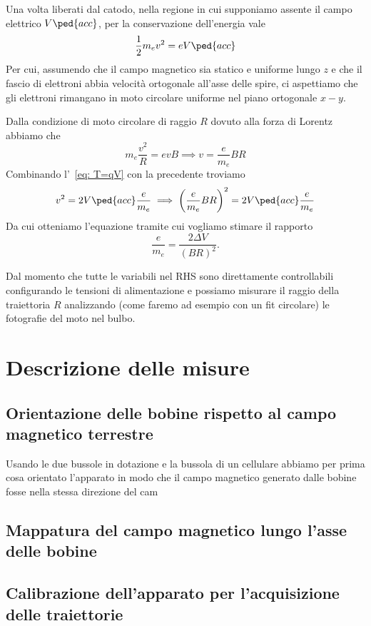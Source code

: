 \documentclass[10pt, a4paper, italian]{article}
\begin{document}
Una volta liberati dal catodo, nella regione in cui supponiamo assente il
campo elettrico $V\ped{acc}$, per la conservazione dell'energia vale
\begin{equation}\label{eq: T=qV}
    \frac{1}{2} m_{e} v^{2} = e V\ped{acc}
\end{equation}
Per cui, assumendo che il campo magnetico sia statico e uniforme lungo $z$ e
che il fascio di elettroni abbia velocità ortogonale all'asse delle spire,
ci aspettiamo che gli elettroni rimangano in moto circolare uniforme nel
piano ortogonale $x-y$.

Dalla condizione di moto circolare di raggio $R$ dovuto alla forza di Lorentz
abbiamo che
\[
m_{e} \frac{v^2}{R} = e v B \implies v = \frac{e}{m_e} B R
\]
Combinando l'~\cref{eq: T=qV} con la precedente troviamo
\[
v^2 = 2 V\ped{acc} \frac{e}{m_e} \implies \left(\frac{e}{m_e} B R\right)^2 =
2 V\ped{acc} \frac{e}{m_e}
\]
Da cui otteniamo l'equazione tramite cui vogliamo stimare il rapporto
\begin{equation}\label{eq: fit}
\frac{e}{m_{e}} = \frac{2 \Delta V}{(BR)^2}.
\end{equation}

Dal momento che tutte le variabili nel RHS sono direttamente controllabili
configurando le tensioni di alimentazione e possiamo misurare il raggio
della traiettoria $R$ analizzando (come faremo ad esempio con un fit
circolare) le fotografie del moto nel bulbo.

\section{Descrizione delle misure}
\subsection{Orientazione delle bobine rispetto al campo magnetico terrestre}
Usando le due bussole in dotazione e la bussola di un cellulare abbiamo per
prima cosa orientato l'apparato in modo che il campo magnetico generato dalle
bobine fosse nella stessa direzione del cam
\subsection{Mappatura del campo magnetico lungo l'asse delle bobine}

\subsection{Calibrazione dell'apparato per l'acquisizione delle traiettorie}
\label{sec: conv}
\end{document}
